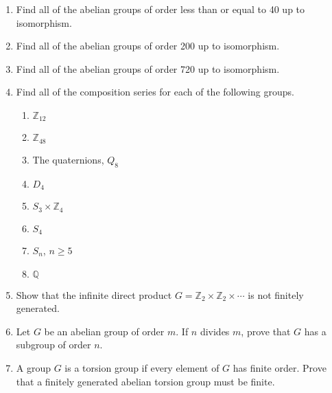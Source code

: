 {\small
\begin{enumerate}
 
\item
Find all of the abelian groups of order less than or equal to 40 up to
isomorphism.
 
\item
Find all of the abelian groups of order 200 up to isomorphism.
 
\item
Find all of the abelian groups of order 720 up to isomorphism.
 
\item
Find all of the composition series for each of the following groups.
\begin{multicols}{2}
\begin{enumerate}

\item
${\mathbb Z}_{12}$

\item
${\mathbb Z}_{48}$

\item
The quaternions, $Q_8$

\item
$D_4$

\item
$S_3 \times {\mathbb Z}_4$

\item
$S_4$

\item
$S_n$, $n \geq 5$

\item
${\mathbb Q}$


\end{enumerate}
\end{multicols}
 
 
 
 
\item  %
Show that the infinite direct product $G = {\mathbb Z}_2 \times {\mathbb
Z}_2 \times \cdots$ is not finitely generated.
 
 
 
\item
Let $G$ be an abelian group of order $m$.  If $n$ divides $m$, prove
that $G$ has a subgroup of order $n$.
 
\item
A group $G$ is a {\bfi torsion group\/} if every 
element of $G$ has finite order.  Prove that a finitely generated abelian
torsion group must be finite.
 

\end{enumerate}}
